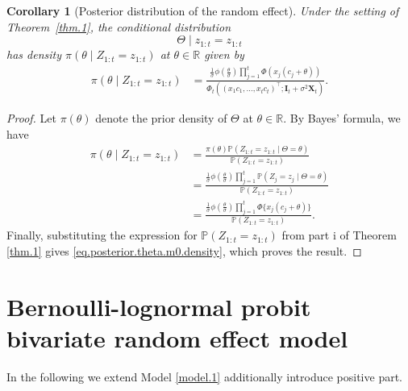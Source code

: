 \documentclass[11pt,authoryear]{elsarticle}
\def\Real{\mathbb{R}}
\def\P#1{{\mathbb{P}}\left(#1\right)}
\newtheorem{corollary}{Corollary}
\theoremstyle{nopunct}
\numberwithin{equation}{section}
\begin{document}
\begin{corollary}[Posterior distribution of the random effect]
\label{cor.2}
Under the setting of Theorem~\ref{thm.1}, the conditional distribution
\[
\Theta\mid z_{1:t}=z_{1:t}
\]
has density \(\pi(\theta\mid Z_{1:t}=z_{1:t})\) at
\(\theta\in\Real\) given by
\begin{equation}\label{eq.posterior.theta.m0.density}
\begin{aligned}
\pi(\theta\mid Z_{1:t}=z_{1:t})
&=
\frac{
\displaystyle
\frac{1}{\sigma}
\phi\left(\frac{\theta}{\sigma}\right)
\prod_{j=1}^t
\Phi\left(x_j(c_j+\theta)\right)
}{
\Phi_t
\left(
(x_1c_1,\ldots,x_tc_t)^\top;
\boldsymbol I_t+\sigma^2\boldsymbol X_t
\right)
}.
\end{aligned}
\end{equation}
\end{corollary}

\begin{proof}
Let \(\pi(\theta)\) denote the prior density of \(\Theta\) at
\(\theta\in\Real\). By Bayes' formula, we have
\[
\begin{aligned}
\pi(\theta\mid Z_{1:t}=z_{1:t})
&=
\frac{
\pi(\theta)
\P{Z_{1:t}=z_{1:t}\mid\Theta=\theta}
}{
\P{Z_{1:t}=z_{1:t}}
}\\
&=
\frac{
\frac{1}{\sigma}
\phi\left(\frac{\theta}{\sigma}\right)
\prod_{j=1}^t
\P{Z_j=z_j\mid\Theta=\theta}
}{
\P{Z_{1:t}=z_{1:t}}
}\\
&=
\frac{
\frac{1}{\sigma}
\phi\left(\frac{\theta}{\sigma}\right)
\prod_{j=1}^t
\Phi\{x_j(c_j+\theta)\}
}{
\P{Z_{1:t}=z_{1:t}}
}.
\end{aligned}
\]
Finally, substituting the expression for
\(\P{Z_{1:t}=z_{1:t}}\) from part i of Theorem \ref{thm.1} gives
\eqref{eq.posterior.theta.m0.density}, which proves the result.
\end{proof}











\section{Bernoulli-lognormal probit bivariate random effect model}\label{sec.6}


In the following we extend Model \ref{model.1} additionally introduce positive part.
\end{document}
